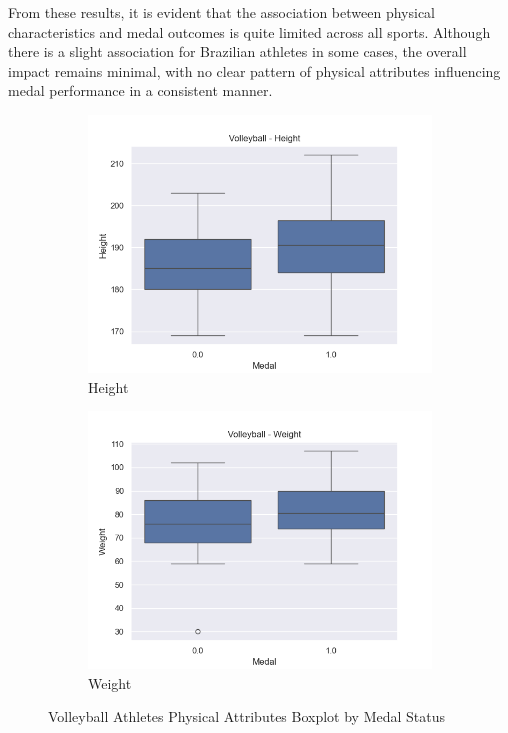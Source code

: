\documentclass{article}
\begin{document}
From these results, it is evident that the association between physical characteristics and medal outcomes is quite limited across all sports. Although there is a slight association for Brazilian athletes in some cases, the overall impact remains minimal, with no clear pattern of physical attributes influencing medal performance in a consistent manner.

\begin{figure}[H]
    \centering
    \begin{subfigure}[b]{0.49\textwidth}
        \centering
        \includegraphics[width=\linewidth]{images/physical_attributes_graphs/Volleyball_Height.png} 
        \caption{Height}
        \label{fig:image1}
    \end{subfigure}
    \begin{subfigure}[b]{0.49\textwidth}
        \centering
        \includegraphics[width=\linewidth]{images/physical_attributes_graphs/Volleyball_Weight.png} 
        \caption{Weight}
        \label{fig:image2}
    \end{subfigure}
    \caption{Volleyball Athletes Physical Attributes Boxplot by Medal Status}
\end{figure}
\end{document}
